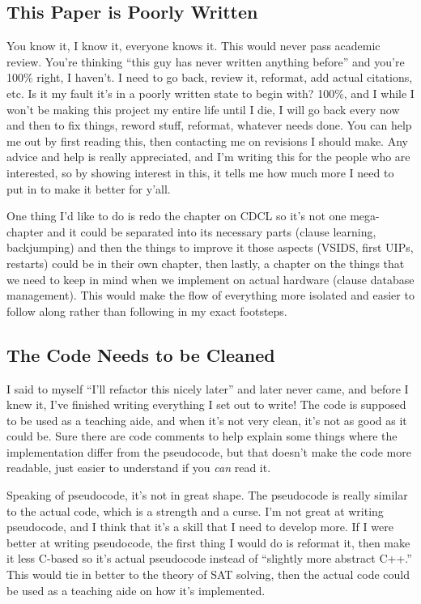\subsection{This Paper is Poorly Written}

You know it, I know it, everyone knows it. This would never pass academic review. 
You're thinking ``this guy has never written anything before'' and you're 100\% 
right, I haven't. I need to go back, review it, reformat, add actual citations, etc.
Is it my fault it's in a poorly written state to begin with? 100\%, and I while I won't 
be making this project my entire life until I die, I will go back every now and then to 
fix things, reword stuff, reformat, whatever needs done. You can help me out by first 
reading this, then contacting me on revisions I should make. Any advice and help is 
really appreciated, and I'm writing this for the people who are interested, so 
by showing interest in this, it tells me how much more I need to put in to make it 
better for y'all.

One thing I'd like to do is redo the chapter on CDCL so it's not one mega-chapter
and it could be separated into its necessary parts (clause learning, backjumping)
and then the things to improve it those aspects (VSIDS, first UIPs, restarts)
could be in their own chapter, then lastly, a chapter on the things that we 
need to keep in mind when we implement on actual hardware (clause database management).
This would make the flow of everything more isolated and easier to follow along 
rather than following in my exact footsteps. 

\subsection{The Code Needs to be Cleaned}

I said to myself ``I'll refactor this nicely later'' and later never came, and before
I knew it, I've finished writing everything I set out to write! The code is supposed to 
be used as a teaching aide, and when it's not very clean, it's not as good as it could be. 
Sure there are code comments to help explain some things where the implementation differ 
from the pseudocode, but that doesn't make the code more readable, just easier to understand 
if you \textit{can} read it.

Speaking of pseudocode, it's not in great shape. The pseudocode is really similar to the 
actual code, which is a strength and a curse. I'm not great at writing pseudocode, and I 
think that it's a skill that I need to develop more. If I were better at writing pseudocode,
the first thing I would do is reformat it, then make it less C-based so it's actual 
pseudocode instead of ``slightly more abstract C++.'' This would tie in better to the 
theory of SAT solving, then the actual code could be used as a teaching aide on how it's 
implemented.

